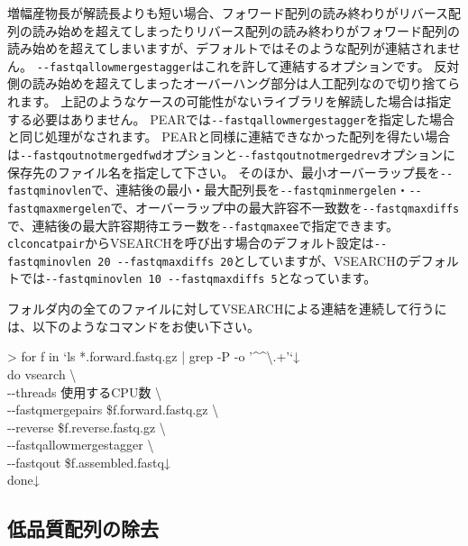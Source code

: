 \documentclass[titlepage,10pt,a4paper]{jsbook}
\newenvironment{cmd}{\begin{oframed}\raggedright\ttfamily\footnotesize\setlength{\baselineskip}{1.4em}}{\end{oframed}\vspace{-1em}}
\begin{document}
増幅産物長が解読長よりも短い場合、フォワード配列の読み終わりがリバース配列の読み始めを超えてしまったりリバース配列の読み終わりがフォワード配列の読み始めを超えてしまいますが、デフォルトではそのような配列が連結されません。
\texttt{{-}{-}fastq{\textunderscore}allowmergestagger}はこれを許して連結するオプションです。
反対側の読み始めを超えてしまったオーバーハング部分は人工配列なので切り捨てられます。
上記のようなケースの可能性がないライブラリを解読した場合は指定する必要はありません。
PEARでは\texttt{{-}{-}fastq{\textunderscore}allowmergestagger}を指定した場合と同じ処理がなされます。
PEARと同様に連結できなかった配列を得たい場合は\texttt{{-}{-}fastqout{\textunderscore}notmerged{\textunderscore}fwd}オプションと\texttt{{-}{-}fastqout{\textunderscore}notmerged{\textunderscore}rev}オプションに保存先のファイル名を指定して下さい。
そのほか、最小オーバーラップ長を\texttt{{-}{-}fastq{\textunderscore}minovlen}で、連結後の最小・最大配列長を\texttt{{-}{-}fastq{\textunderscore}minmergelen}・\texttt{{-}{-}fastq{\textunderscore}maxmergelen}で、オーバーラップ中の最大許容不一致数を\texttt{{-}{-}fastq{\textunderscore}maxdiffs}で、連結後の最大許容期待エラー数を\texttt{{-}{-}fastq{\textunderscore}maxee}で指定できます。
\texttt{clconcatpair}からVSEARCHを呼び出す場合のデフォルト設定は\texttt{{-}{-}fastq{\textunderscore}minovlen 20 {-}{-}fastq{\textunderscore}maxdiffs 20}としていますが、VSEARCHのデフォルトでは\texttt{{-}{-}fastq{\textunderscore}minovlen 10 {-}{-}fastq{\textunderscore}maxdiffs 5}となっています。

フォルダ内の全てのファイルに対してVSEARCHによる連結を連続して行うには、以下のようなコマンドをお使い下さい。

\begin{cmd}
{\textgreater} for f in `ls *.forward.fastq.gz | grep -P -o '{\textasciicircum}{\lbrack}{\textasciicircum}{\textbackslash}.{\rbrack}+'`↓\\
do vsearch {\textbackslash}\\
{-}{-}threads 使用するCPU数 {\textbackslash}\\
{-}{-}fastq{\textunderscore}mergepairs \$f.forward.fastq.gz {\textbackslash}\\
{-}{-}reverse \$f.reverse.fastq.gz {\textbackslash}\\
{-}{-}fastq{\textunderscore}allowmergestagger {\textbackslash}\\
{-}{-}fastqout \$f.assembled.fastq↓\\
done↓
\end{cmd}

\subsection{低品質配列の除去}
\end{document}
